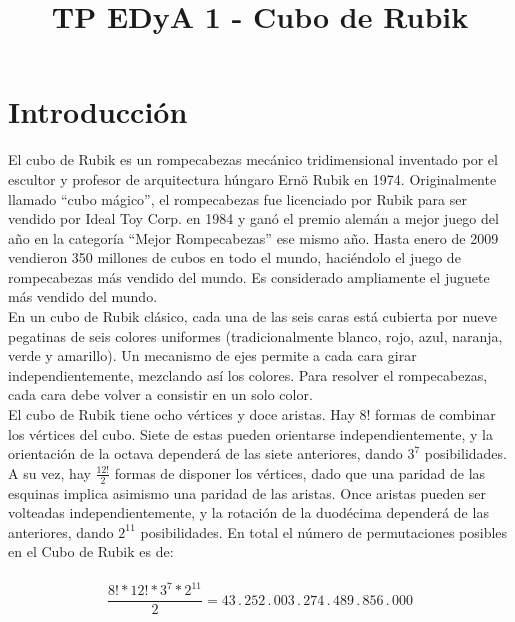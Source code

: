 \documentclass[11pt,a4paper]{article}
\begin{document}
\title{TP EDyA 1 - Cubo de Rubik}

\maketitle


\section{Introducción}

El cubo de Rubik es un rompecabezas mecánico tridimensional inventado por el escultor y profesor de arquitectura húngaro Ernö Rubik en 1974. Originalmente llamado ``cubo mágico'', el rompecabezas fue licenciado por Rubik para ser vendido por Ideal Toy Corp. en 1984 y ganó el premio alemán a mejor juego del año en la categoría ``Mejor Rompecabezas'' ese mismo año. Hasta enero de 2009 vendieron 350 millones de cubos en todo el mundo, haciéndolo el juego de rompecabezas más vendido del mundo. Es considerado ampliamente el juguete más vendido del mundo. \\

En un cubo de Rubik clásico, cada una de las seis caras está cubierta por nueve pegatinas de seis colores uniformes (tradicionalmente blanco, rojo, azul, naranja, verde y amarillo). Un mecanismo de ejes permite a cada cara girar independientemente, mezclando así los colores. Para resolver el rompecabezas, cada cara debe volver a consistir en un solo color.\\

El cubo de Rubik tiene ocho vértices y doce aristas. Hay $8!$ formas de combinar los vértices del cubo. Siete de estas pueden orientarse independientemente, y la orientación de la octava dependerá de las siete anteriores, dando  $3^7$ posibilidades. A su vez, hay $\frac{12!}{2}$ formas de disponer los vértices, dado que una paridad de las esquinas implica asimismo una paridad de las aristas. Once aristas pueden ser volteadas independientemente, y la rotación de la duodécima dependerá de las anteriores, dando $2^{11}$ posibilidades. En total el número de permutaciones posibles en el Cubo de Rubik es de:\\
\\
 $$ \frac{8!*12!*3^7*2^{11}}{2} = 43 \,.\, 252 \,.\, 003 \,.\, 274 \,.\, 489 \,.\, 856 \,.\, 000 $$ \\
\end{document}
